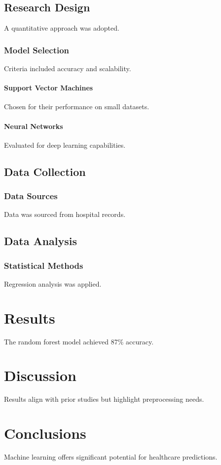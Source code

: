 \documentclass[12pt,a4paper]{article}
\begin{document}
\subsection{Research Design}
A quantitative approach was adopted.

\subsubsection{Model Selection}
Criteria included accuracy and scalability.

\paragraph{Support Vector Machines}
Chosen for their performance on small datasets.

\paragraph{Neural Networks}
Evaluated for deep learning capabilities.

\subsection{Data Collection}
\subsubsection{Data Sources}
Data was sourced from hospital records.

\subsection{Data Analysis}
\subsubsection{Statistical Methods}
Regression analysis was applied.

\section{Results}
The random forest model achieved 87\% accuracy.

\section{Discussion}
Results align with prior studies but highlight preprocessing needs.

\section{Conclusions}
Machine learning offers significant potential for healthcare predictions.
\end{document}

